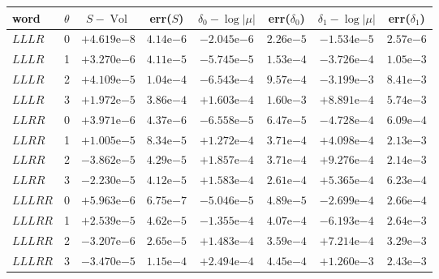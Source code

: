 \documentclass[11pt]{amsart}
\theoremstyle{definition}
\theoremstyle{remark}
\newcommand{\Vol}{\operatorname{Vol}}
\begin{document}
\begin{table}[ht]
\centering
\small
\setlength{\tabcolsep}{4pt}
\begin{tabular}{llcccccc}
\toprule
word & $\theta$ & $S - \Vol$ & err($S$) & $\delta_0 - \log|\mu|$ & err($\delta_0$) & $\delta_1 - \log|\mu|$ & err($\delta_1$) \\
\midrule
$LLLR$  & 0 & $+4.619\mathrm{e}{-8}$ & $4.14\mathrm{e}{-6}$ & $-2.045\mathrm{e}{-6}$ & $2.26\mathrm{e}{-5}$ & $-1.534\mathrm{e}{-5}$ & $2.57\mathrm{e}{-6}$ \\
$LLLR$  & 1 & $+3.270\mathrm{e}{-6}$ & $4.11\mathrm{e}{-5}$ & $-5.745\mathrm{e}{-5}$ & $1.53\mathrm{e}{-4}$ & $-3.726\mathrm{e}{-4}$ & $1.05\mathrm{e}{-3}$ \\
$LLLR$  & 2 & $+4.109\mathrm{e}{-5}$ & $1.04\mathrm{e}{-4}$ & $-6.543\mathrm{e}{-4}$ & $9.57\mathrm{e}{-4}$ & $-3.199\mathrm{e}{-3}$ & $8.41\mathrm{e}{-3}$ \\
$LLLR$  & 3 & $+1.972\mathrm{e}{-5}$ & $3.86\mathrm{e}{-4}$ & $+1.603\mathrm{e}{-4}$ & $1.60\mathrm{e}{-3}$ & $+8.891\mathrm{e}{-4}$ & $5.74\mathrm{e}{-3}$ \\
$LLRR$  & 0 & $+3.971\mathrm{e}{-6}$ & $4.37\mathrm{e}{-6}$ & $-6.558\mathrm{e}{-5}$ & $6.47\mathrm{e}{-5}$ & $-4.728\mathrm{e}{-4}$ & $6.09\mathrm{e}{-4}$ \\
$LLRR$  & 1 & $+1.005\mathrm{e}{-5}$ & $8.34\mathrm{e}{-5}$ & $+1.272\mathrm{e}{-4}$ & $3.71\mathrm{e}{-4}$ & $+4.098\mathrm{e}{-4}$ & $2.13\mathrm{e}{-3}$ \\
$LLRR$  & 2 & $-3.862\mathrm{e}{-5}$ & $4.29\mathrm{e}{-5}$ & $+1.857\mathrm{e}{-4}$ & $3.71\mathrm{e}{-4}$ & $+9.276\mathrm{e}{-4}$ & $2.14\mathrm{e}{-3}$ \\
$LLRR$  & 3 & $-2.230\mathrm{e}{-5}$ & $4.12\mathrm{e}{-5}$ & $+1.583\mathrm{e}{-4}$ & $2.61\mathrm{e}{-4}$ & $+5.365\mathrm{e}{-4}$ & $6.23\mathrm{e}{-4}$ \\
$LLLRR$ & 0 & $+5.963\mathrm{e}{-6}$ & $6.75\mathrm{e}{-7}$ & $-5.046\mathrm{e}{-5}$ & $4.89\mathrm{e}{-5}$ & $-2.699\mathrm{e}{-4}$ & $2.66\mathrm{e}{-4}$ \\
$LLLRR$ & 1 & $+2.539\mathrm{e}{-5}$ & $4.62\mathrm{e}{-5}$ & $-1.355\mathrm{e}{-4}$ & $4.07\mathrm{e}{-4}$ & $-6.193\mathrm{e}{-4}$ & $2.64\mathrm{e}{-3}$ \\
$LLLRR$ & 2 & $-3.207\mathrm{e}{-6}$ & $2.65\mathrm{e}{-5}$ & $+1.483\mathrm{e}{-4}$ & $3.59\mathrm{e}{-4}$ & $+7.214\mathrm{e}{-4}$ & $3.29\mathrm{e}{-3}$ \\
$LLLRR$ & 3 & $-3.470\mathrm{e}{-5}$ & $1.15\mathrm{e}{-4}$ & $+2.494\mathrm{e}{-4}$ & $4.45\mathrm{e}{-4}$ & $+1.260\mathrm{e}{-3}$ & $2.43\mathrm{e}{-3}$ \\

\end{tabular}
\end{table}
\end{document}
